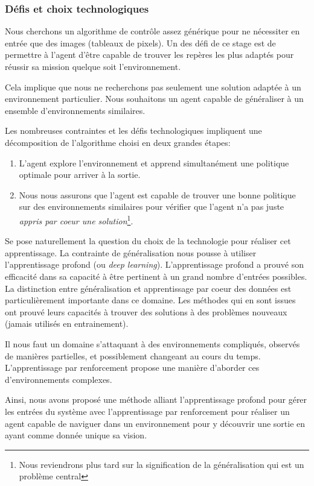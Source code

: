 \subsubsection{Défis et choix technologiques}

Nous cherchons un algorithme de contrôle assez générique pour ne nécessiter en entrée que des images (tableaux de pixels). Un des défi de ce stage est de permettre à  l'agent d'être capable de trouver les repères les plus adaptés pour réussir sa mission quelque soit l'environnement.

Cela implique que nous ne recherchons pas seulement une solution adaptée à un environnement particulier. Nous souhaitons un agent capable de généraliser à un ensemble d'environnements similaires. 

Les nombreuses contraintes et les défis technologiques impliquent une décomposition de l'algorithme choisi en deux grandes étapes:

\begin{enumerate}
    \item L'agent explore l'environnement et apprend simultanément une politique optimale pour arriver à la sortie.
    \item Nous nous assurons que l'agent est capable de trouver une bonne politique sur des environnements similaires pour vérifier que l'agent n'a pas juste \emph{appris par coeur une solution}\footnote{Nous reviendrons plus tard sur la signification de la généralisation qui est un problème central}.
\end{enumerate}

Se pose naturellement la question du choix de la technologie pour réaliser cet apprentissage.
La contrainte de généralisation nous pousse à utiliser l'apprentissage profond (ou \emph{deep learning}). L'apprentissage profond a prouvé son efficacité dans sa capacité à être pertinent à un grand nombre d'entrées possibles.  
La distinction entre généralisation et apprentissage par coeur des données est particulièrement importante dans ce domaine. Les méthodes qui en sont issues ont prouvé leurs capacités à trouver des solutions à des problèmes nouveaux (jamais utilisés en entrainement).

Il nous faut un domaine s'attaquant à des environnements compliqués, observés de manières partielles, et possiblement changeant au cours du temps. L'apprentissage par renforcement propose une manière d'aborder ces d'environnements complexes. 

Ainsi, nous avons proposé une méthode alliant l'apprentissage profond pour gérer les entrées du système avec l'apprentissage par renforcement pour réaliser un agent capable de naviguer dans un environnement pour y découvrir une sortie en ayant comme donnée unique sa vision.

